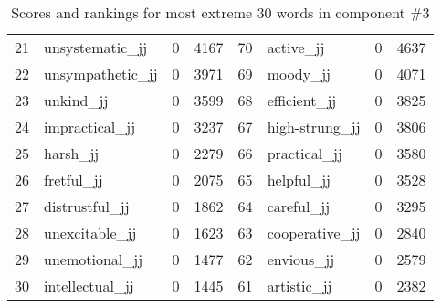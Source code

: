 \begin{table}[tbp]
\begin{tabular}{| rlr@{.}l | rlr@{.}l |}
    21 & unsystematic\_jj & 0 & 4167    &    70 & active\_jj & 0 & 4637 \\
    22 & unsympathetic\_jj & 0 & 3971    &    69 & moody\_jj & 0 & 4071 \\
    23 & unkind\_jj & 0 & 3599    &    68 & efficient\_jj & 0 & 3825 \\
    24 & impractical\_jj & 0 & 3237    &    67 & high-strung\_jj & 0 & 3806 \\
    25 & harsh\_jj & 0 & 2279    &    66 & practical\_jj & 0 & 3580 \\
    26 & fretful\_jj & 0 & 2075    &    65 & helpful\_jj & 0 & 3528 \\
    27 & distrustful\_jj & 0 & 1862    &    64 & careful\_jj & 0 & 3295 \\
    28 & unexcitable\_jj & 0 & 1623    &    63 & cooperative\_jj & 0 & 2840 \\
    29 & unemotional\_jj & 0 & 1477    &    62 & envious\_jj & 0 & 2579 \\
    30 & intellectual\_jj & 0 & 1445    &    61 & artistic\_jj & 0 & 2382 \\
    \hline
    \end{tabular}
    \caption{Scores and rankings for most extreme 30 words in component \#3} 
\end{table}
\clearpage
